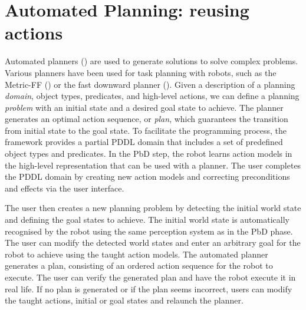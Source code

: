 

\section{Automated Planning: reusing actions}\label{sec:AP}
Automated planners () are used to generate solutions to solve complex problems.
Various planners have been used for task planning with robots, such as the Metric-FF (\cite{cubek2015high}) or the fast downward planner (\cite{abdo2013learning}). 
Given a description of a planning \textit{domain}, \ie object types, predicates, and high-level actions, we can define a planning \textit{problem} with an initial state and a desired goal state to achieve. 
The planner generates an optimal action sequence, or \textit{plan}, which guarantees the transition from initial state to the goal state. 
To facilitate the programming process, the framework provides a partial PDDL domain that includes a set of predefined object types and predicates.
In the PbD step, the robot learns action models in the high-level representation that can be used with a planner. 
The user completes the PDDL domain by creating new action models and correcting preconditions and effects via the user interface.

The user then creates a new planning problem by detecting the initial world state and defining the goal states to achieve.
The initial world state is automatically recognised by the robot using the same perception system as in the PbD phase. 
The user can modify the detected world states and enter an arbitrary goal for the robot to achieve using the taught action models.
The automated planner generates a plan, consisting of an ordered action sequence for the robot to execute. 
The user can verify the generated plan and have the robot execute it in real life.
If no plan is generated or if the plan seems incorrect, users can modify the taught actions, initial or goal states and relaunch the planner.


